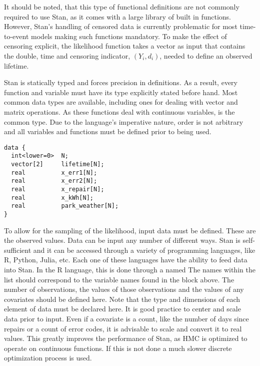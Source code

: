 It should be noted, that this type of functional definitions are not commonly required to use Stan, as it comes with a large library of built in functions\cite{StanDevelopmentTeam2016}. However, Stan's handling of censored data is currently problematic for most time-to-event models making such functions mandatory. To make the effect of censoring explicit, the likelihood function takes a vector as input  that contains the double, time and censoring indicator, $(Y_i,d_i)$, needed to define an observed lifetime. 

Stan is statically typed and forces precision in definitions. As a result, every function and variable must have its type explicitly stated before hand. Most common data types are available, including ones for dealing with vector and matrix operations. As these functions deal with continuous variables,  is the common type. Due to the language's imperative nature, order is not arbitrary and all variables and functions must be defined prior to being used. 


\begin{lstlisting}
data {
  int<lower=0>  N;
  vector[2]     lifetime[N];
  real          x_err1[N];
  real          x_err2[N];
  real          x_repair[N];
  real          x_kWh[N];
  real          park_weather[N];
}
\end{lstlisting}


To allow for the sampling of the likelihood, input data must be defined. These are the observed values. Data can be input any number of different ways. Stan is self-sufficient and it can be accessed through a variety of programming languages, like R, Python, Julia, etc. Each one of these languages have the ability to feed data into Stan. In the R language, this is done through a named  The names within the list should correspond to the variable names found in the  block above. The number of observations, the values of those observations and the values of any covariates should be defined here. Note that the type and dimensions of each element of data must be declared here. It is good practice to center and scale data prior to input. Even if a covariate is a count, like the number of days since repairs or a count of error codes, it is advisable to scale and convert it to real values. This greatly improves the performance of Stan, as HMC is optimized to operate on continuous functions. If this is not done a much slower discrete optimization process is used. 



